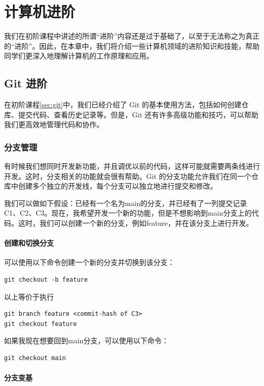 \documentclass[../main.tex]{subfiles}
\begin{document}
\chapter{计算机进阶}

我们在初阶课程中讲述的所谓“进阶”内容还是过于基础了，以至于无法称之为真正的“进阶”。因此，在本章中，我们将介绍一些计算机领域的进阶知识和技能，帮助同学们更深入地理解计算机的工作原理和应用。

\section{Git 进阶}\label{sec:git-advanced}

在初阶课程\ref{sec:git}中，我们已经介绍了 Git 的基本使用方法，包括如何创建仓库、提交代码、查看历史记录等。但是，Git 还有许多高级功能和技巧，可以帮助我们更高效地管理代码和协作。

\subsection{分支管理}

有时候我们想同时开发新功能，并且调优以前的代码，这样可能就需要两条线进行开发。这时，分支相关的功能就会很有帮助。Git 的分支功能允许我们在同一个仓库中创建多个独立的开发线，每个分支可以独立地进行提交和修改。

我们可以做如下假设：已经有一个名为main的分支，并已经有了一列提交记录C1、C2、C3。现在，我希望开发一个新的功能，但是不想影响到main分支上的代码。这时，我们可以创建一个新的分支，例如feature，并在该分支上进行开发。

\subsubsection{创建和切换分支}

可以使用以下命令创建一个新的分支并切换到该分支：
\begin{verbatim}
git checkout -b feature
\end{verbatim}

以上等价于执行
\begin{verbatim}
git branch feature <commit-hash of C3>
git checkout feature
\end{verbatim}

如果我现在想要回到main分支，可以使用以下命令：
\begin{verbatim}
git checkout main
\end{verbatim}

\subsubsection{分支变基}
\end{document}
